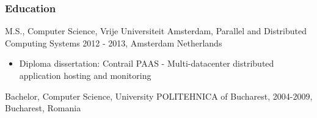 \documentclass[
]{rss}
\providecommand{\tightlist}{%
  \setlength{\itemsep}{0pt}\setlength{\parskip}{0pt}}
\begin{document}
\begin{resume}
\hypertarget{education}{%
\subsubsection{Education}\label{education}}

M.S., Computer Science, Vrije Universiteit Amsterdam, Parallel and
Distributed Computing Systems 2012 - 2013, Amsterdam Netherlands

\begin{itemize}
\tightlist
\item
  Diploma dissertation: Contrail PAAS - Multi-datacenter distributed
  application hosting and monitoring
\end{itemize}

Bachelor, Computer Science, University POLITEHNICA of Bucharest,
2004-2009, Bucharest, Romania

\end{resume}
\end{document}
